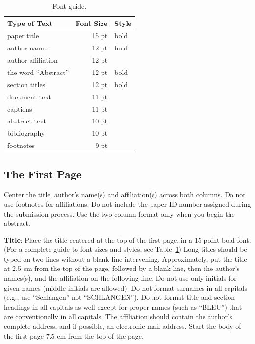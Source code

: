 \documentclass[11pt]{article}
\begin{document}
\begin{table}[h]
\begin{center}
\begin{tabular}{|l|rl|}
\hline \bf Type of Text & \bf Font Size & \bf Style \\ \hline
paper title & 15 pt & bold \\
author names & 12 pt & bold \\
author affiliation & 12 pt & \\
the word ``Abstract'' & 12 pt & bold \\
section titles & 12 pt & bold \\
document text & 11 pt  &\\
captions & 11 pt & \\
abstract text & 10 pt & \\
bibliography & 10 pt & \\
footnotes & 9 pt & \\
\hline
\end{tabular}
\end{center}
\caption{\label{font-table} Font guide. }
\end{table}

\subsection{The First Page}
\label{ssec:first}

Center the title, author's name(s) and affiliation(s) across both
columns. Do not use footnotes for affiliations. Do not include the
paper ID number assigned during the submission process. Use the
two-column format only when you begin the abstract.

{\bf Title}: Place the title centered at the top of the first page, in
a 15-point bold font. (For a complete guide to font sizes and styles,
see Table~\ref{font-table}) Long titles should be typed on two lines
without a blank line intervening. Approximately, put the title at 2.5
cm from the top of the page, followed by a blank line, then the
author's names(s), and the affiliation on the following line. Do not
use only initials for given names (middle initials are allowed). Do
not format surnames in all capitals (e.g., use ``Schlangen'' not
``SCHLANGEN'').  Do not format title and section headings in all
capitals as well except for proper names (such as ``BLEU'') that are
conventionally in all capitals.  The affiliation should contain the
author's complete address, and if possible, an electronic mail
address. Start the body of the first page 7.5 cm from the top of the
page.
\end{document}
